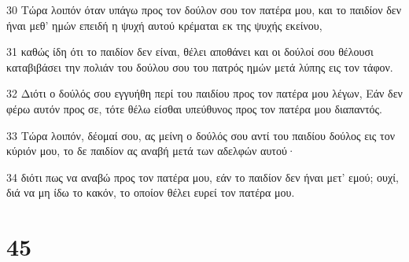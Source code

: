 \par 30 Τώρα λοιπόν όταν υπάγω προς τον δούλον σου τον πατέρα μου, και το παιδίον δεν ήναι μεθ' ημών επειδή η ψυχή αυτού κρέμαται εκ της ψυχής εκείνου,
\par 31 καθώς ίδη ότι το παιδίον δεν είναι, θέλει αποθάνει και οι δούλοί σου θέλουσι καταβιβάσει την πολιάν του δούλου σου του πατρός ημών μετά λύπης εις τον τάφον.
\par 32 Διότι ο δούλός σου εγγυήθη περί του παιδίου προς τον πατέρα μου λέγων, Εάν δεν φέρω αυτόν προς σε, τότε θέλω είσθαι υπεύθυνος προς τον πατέρα μου διαπαντός.
\par 33 Τώρα λοιπόν, δέομαί σου, ας μείνη ο δούλός σου αντί του παιδίου δούλος εις τον κύριόν μου, το δε παιδίον ας αναβή μετά των αδελφών αυτού·
\par 34 διότι πως να αναβώ προς τον πατέρα μου, εάν το παιδίον δεν ήναι μετ' εμού; ουχί, διά να μη ίδω το κακόν, το οποίον θέλει ευρεί τον πατέρα μου.

\chapter{45}

